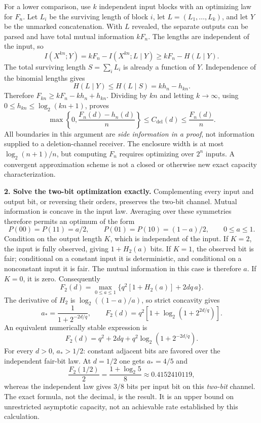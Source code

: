 \documentclass[11pt,a4paper]{article}
\numberwithin{equation}{section}
\begin{document}
For a lower comparison, use $k$ independent input blocks with an
optimizing law for $F_n$. Let $L_i$ be the surviving length of block $i$,
let $L=(L_1,\ldots,L_k)$, and let $Y$ be the unmarked concatenation.
With $L$ revealed, the separate outputs can be parsed and have total
mutual information $kF_n$. The lengths are independent of the input, so
\[
 I(X^{kn};Y)=kF_n-I(X^{kn};L\mid Y)
          \ge kF_n-H(L\mid Y).
\]
The total surviving length $S=\sum_iL_i$ is already a function of $Y$.
Independence of the binomial lengths gives
\[
 H(L\mid Y)\le H(L\mid S)=kh_n-h_{kn}.
\]
Therefore $F_{kn}\ge kF_n-kh_n+h_{kn}$. Dividing by $kn$ and letting
$k\to\infty$, using $0\le h_{kn}\le\log_2(kn+1)$, proves
\begin{equation}\label{225:enclosure}
 \max\left\{0,\frac{F_n(d)-h_n(d)}n\right\}
 \le C_{\mathrm{del}}(d)\le\frac{F_n(d)}n.
\end{equation}
All boundaries in this argument are \emph{side information in a proof},
not information supplied to a deletion-channel receiver.
The enclosure width is at most $\log_2(n+1)/n$, but computing $F_n$
requires optimizing over $2^n$ inputs. A convergent approximation scheme
is not a closed or otherwise new exact capacity characterization.

\textbf{2. Solve the two-bit optimization exactly.}
Complementing every input and output bit, or reversing their orders,
preserves the two-bit channel. Mutual information is concave in the
input law. Averaging over these symmetries therefore permits an optimum
of the form
\[
 P(00)=P(11)=a/2,\qquad P(01)=P(10)=(1-a)/2,
 \qquad0\le a\le1.
\]
Condition on the output length $K$, which is independent of the input.
If $K=2$, the input is fully observed, giving $1+H_2(a)$ bits. If
$K=1$, the observed bit is fair; conditional on a constant input it is
deterministic, and conditional on a nonconstant input it is fair. The
mutual information in this case is therefore $a$. If $K=0$, it is zero.
Consequently
\begin{equation}\label{225:twobit}
 F_2(d)=\max_{0\le a\le1}
 \{q^2[1+H_2(a)]+2dq\,a\}.
\end{equation}
The derivative of $H_2$ is $\log_2((1-a)/a)$, so strict concavity gives
\[
 a_* =\frac1{1+2^{-2d/q}},\qquad
 F_2(d)=q^2\left[1+\log_2(1+2^{2d/q})\right].
\]
An equivalent numerically stable expression is
\begin{equation}\label{225:closed}
 F_2(d)=q^2+2dq+q^2\log_2(1+2^{-2d/q}).
\end{equation}
For every $d>0$, $a_*>1/2$: constant adjacent bits are favored over the
independent fair-bit law. At $d=1/2$ one gets $a_*=4/5$ and
\[
 \frac{F_2(1/2)}2=\frac{1+\log_2 5}{8}
                  \approx0.4152410119,
\]
whereas the independent law gives $3/8$ bits per input bit on this
\emph{two-bit} channel. The exact formula, not the decimal, is the result.
It is an upper bound on unrestricted asymptotic capacity, not an
achievable rate established by this calculation.
\end{document}
